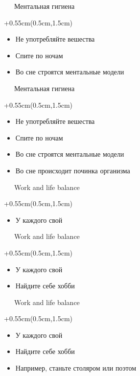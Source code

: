 \documentclass[xetex,18pt,aspectratio=169]{beamer}
\begin{document}
\begin{Large}
\begin{frame}{\ \ \ Ментальная гигиена}
\begin{textblock*}{\framewidth+0.55cm}(0.5cm,1.5cm)
\begin{itemize}
  \item Не употребляйте вешества
  \item Спите по ночам
  \item Во сне строятся ментальные модели
\end{itemize}
\end{textblock*}
\end{frame}

\begin{frame}{\ \ \ Ментальная гигиена}
\begin{textblock*}{\framewidth+0.55cm}(0.5cm,1.5cm)
\begin{itemize}
  \item Не употребляйте вешества
  \item Спите по ночам
  \item Во сне строятся ментальные модели
  \item Во сне происходит починка организма
\end{itemize}
\end{textblock*}
\end{frame}

\begin{frame}{\ \ \ Work and life balance}
\begin{textblock*}{\framewidth+0.55cm}(0.5cm,1.5cm)
\begin{itemize}
  \item У каждого свой
\end{itemize}
\end{textblock*}
\end{frame}

\begin{frame}{\ \ \ Work and life balance}
\begin{textblock*}{\framewidth+0.55cm}(0.5cm,1.5cm)
\begin{itemize}
  \item У каждого свой
  \item Найдите себе хобби
\end{itemize}
\end{textblock*}
\end{frame}

\begin{frame}{\ \ \ Work and life balance}
\begin{textblock*}{\framewidth+0.55cm}(0.5cm,1.5cm)
\begin{itemize}
  \item У каждого свой
  \item Найдите себе хобби
  \item Например, станьте столяром или поэтом
\end{itemize}
\end{textblock*}
\end{frame}


\end{Large}
\end{document}
